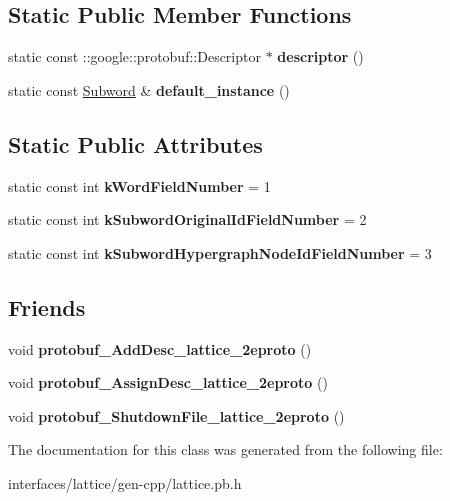 \subsection*{Static Public Member Functions}
\begin{DoxyCompactItemize}
\item 
\hypertarget{classlattice_1_1Subword_a4cb5b6f8f430f64c22a8d9ad6ff71e0f}{
static const ::google::protobuf::Descriptor $\ast$ {\bfseries descriptor} ()}
\label{classlattice_1_1Subword_a4cb5b6f8f430f64c22a8d9ad6ff71e0f}

\item 
\hypertarget{classlattice_1_1Subword_aa4ea6b1d5660bcf71344bff17b0d4e1c}{
static const \hyperlink{classlattice_1_1Subword}{Subword} \& {\bfseries default\_\-instance} ()}
\label{classlattice_1_1Subword_aa4ea6b1d5660bcf71344bff17b0d4e1c}

\end{DoxyCompactItemize}
\subsection*{Static Public Attributes}
\begin{DoxyCompactItemize}
\item 
\hypertarget{classlattice_1_1Subword_a795d7849c138b766c0de1000929a9279}{
static const int {\bfseries kWordFieldNumber} = 1}
\label{classlattice_1_1Subword_a795d7849c138b766c0de1000929a9279}

\item 
\hypertarget{classlattice_1_1Subword_accafa8353a5d494473b8a7e9903b051d}{
static const int {\bfseries kSubwordOriginalIdFieldNumber} = 2}
\label{classlattice_1_1Subword_accafa8353a5d494473b8a7e9903b051d}

\item 
\hypertarget{classlattice_1_1Subword_a581a69ab155520b618cdd2146bc87752}{
static const int {\bfseries kSubwordHypergraphNodeIdFieldNumber} = 3}
\label{classlattice_1_1Subword_a581a69ab155520b618cdd2146bc87752}

\end{DoxyCompactItemize}
\subsection*{Friends}
\begin{DoxyCompactItemize}
\item 
\hypertarget{classlattice_1_1Subword_a19e63fb37025879e023cad88064187cf}{
void {\bfseries protobuf\_\-AddDesc\_\-lattice\_\-2eproto} ()}
\label{classlattice_1_1Subword_a19e63fb37025879e023cad88064187cf}

\item 
\hypertarget{classlattice_1_1Subword_a3b0386e09a9fefcf1bdce658cfc480b2}{
void {\bfseries protobuf\_\-AssignDesc\_\-lattice\_\-2eproto} ()}
\label{classlattice_1_1Subword_a3b0386e09a9fefcf1bdce658cfc480b2}

\item 
\hypertarget{classlattice_1_1Subword_a3c7b187721d0704ceb19ff889729d35a}{
void {\bfseries protobuf\_\-ShutdownFile\_\-lattice\_\-2eproto} ()}
\label{classlattice_1_1Subword_a3c7b187721d0704ceb19ff889729d35a}

\end{DoxyCompactItemize}


The documentation for this class was generated from the following file:\begin{DoxyCompactItemize}
\item 
interfaces/lattice/gen-\/cpp/lattice.pb.h\end{DoxyCompactItemize}
